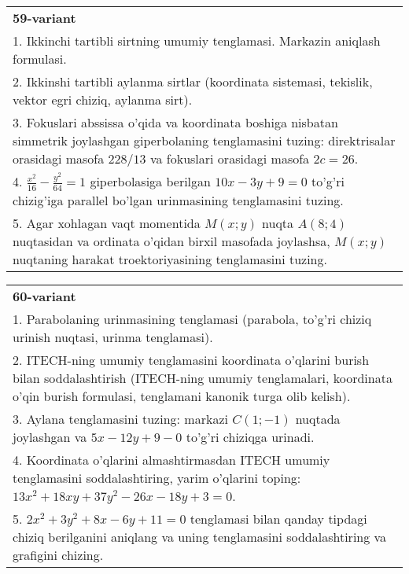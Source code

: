 \documentclass{article}
\begin{document}
\begin{tabular}{m{17cm}}
\textbf{59-variant}\\
1. Ikkinchi tartibli sirtning umumiy tenglamasi. Markazin aniqlash formulasi.\\

2. Ikkinshi tartibli aylanma sirtlar (koordinata sistemasi, tekislik, vektor egri chiziq, aylanma sirt).\\

3. Fokuslari abssissa o'qida va koordinata boshiga nisbatan simmetrik joylashgan giperbolaning tenglamasini tuzing: direktrisalar orasidagi masofa $228/13$ va fokuslari orasidagi masofa $2c=26$.\\

4. $\frac{x^{2}}{16} - \frac{y^{2}}{64} = 1$ giperbolasiga berilgan $10x - 3y + 9 = 0$ to'g'ri chizig'iga parallel bo'lgan urinmasining tenglamasini tuzing.  \\

5. Agar xohlagan vaqt momentida $M(x;y)$ nuqta $A(8;4)$ nuqtasidan va ordinata o'qidan birxil masofada joylashsa, $M(x;y)$ nuqtaning harakat troektoriyasining tenglamasini tuzing.  
\end{tabular}
\vspace{1cm}


\begin{tabular}{m{17cm}}
\textbf{60-variant}\\
1. Parabolaning urinmasining tenglamasi (parabola, to'g'ri chiziq urinish nuqtasi, urinma tenglamasi).\\

2. ITECH-ning umumiy tenglamasini koordinata o'qlarini burish bilan soddalashtirish (ITECH-ning umumiy tenglamalari, koordinata o'qin burish formulasi, tenglamani kanonik turga olib kelish).\\

3. Aylana tenglamasini tuzing: markazi $C(1;-1)$ nuqtada joylashgan va $5x-12y+9-0$ to'g'ri chiziqga urinadi.\\

4. Koordinata o'qlarini almashtirmasdan ITECH umumiy tenglamasini soddalashtiring, yarim o'qlarini toping: $13x^{2} + 18xy + 37y^{2} - 26x - 18y + 3 = 0$.  \\

5. $2x^{2} + 3y^{2} + 8x - 6y + 11 = 0$ tenglamasi bilan qanday tipdagi chiziq berilganini aniqlang va uning tenglamasini soddalashtiring va grafigini chizing.  
\end{tabular}
\vspace{1cm}
\end{document}
